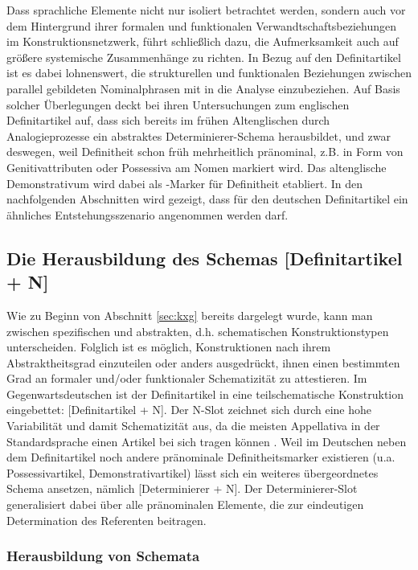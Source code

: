 Dass sprachliche Elemente nicht nur isoliert betrachtet werden, sondern auch vor dem Hintergrund ihrer formalen und funktionalen Verwandtschaftsbeziehungen im Konstruktionsnetzwerk, führt schließlich dazu, die Aufmerksamkeit auch auf größere systemische Zusammenhänge zu richten. In Bezug auf den Definitartikel ist es dabei lohnenswert, die strukturellen und funktionalen Beziehungen zwischen parallel gebildeten Nominalphrasen mit in die Analyse einzubeziehen. Auf Basis solcher Überlegungen deckt \textcite{Sommerer2011,Sommerer2012,Sommerer2015} bei ihren Untersuchungen zum englischen Definitartikel auf, dass sich bereits im frühen Altenglischen durch Analogieprozesse ein abstraktes Determinierer-Schema herausbildet, und zwar deswegen, weil Definitheit schon früh mehrheitlich pränominal, z.B. in Form von Genitivattributen oder Possessiva am Nomen markiert wird. Das altenglische Demonstrativum  wird dabei als -Marker für Definitheit etabliert. In den nachfolgenden Abschnitten wird gezeigt, dass für den deutschen Definitartikel ein ähnliches Entstehungsszenario angenommen werden darf. 

\subsection{Die Herausbildung des Schemas [Definitartikel + N]}\label{sec:schema}

Wie zu Beginn von Abschnitt \ref{sec:kxg} bereits dargelegt wurde, kann man zwischen spezifischen  und abstrakten, d.h. schematischen Konstruktionstypen unterscheiden.
Folglich ist es möglich, Konstruktionen nach ihrem Abstraktheitsgrad einzuteilen oder anders ausgedrückt, ihnen einen bestimmten Grad an formaler und/oder funktionaler Schematizität zu attestieren. Im Gegenwartsdeutschen ist der Definitartikel in eine teilschematische Konstruktion eingebettet: [Definitartikel + N]. Der N-Slot zeichnet sich durch eine hohe Variabilität und damit Schematizität aus, da die meisten Appellativa in der Standardsprache einen Artikel bei sich tragen können \parencite[zu den Ausnahmen s.][]{DAvis2013}.
Weil im Deutschen neben dem Definitartikel noch andere pränominale Definitheitsmarker existieren (u.a. Possessivartikel, Demonstrativartikel) lässt sich ein weiteres übergeordnetes Schema ansetzen, nämlich [Determinierer + N]. Der Determinierer-Slot generalisiert dabei über alle pränominalen Elemente, die zur eindeutigen Determination des Referenten beitragen. 

\subsubsection{Herausbildung von Schemata} 

